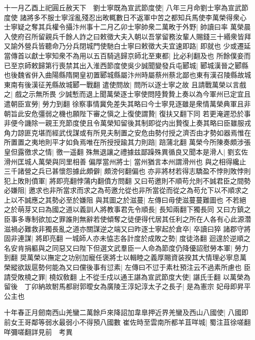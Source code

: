 十一月乙酉上祀圓丘赦天下　劉士寧既為宣武節度使|{
	八年三月命劉士寧為宣武節度使}
諸將多不服士寧淫亂殘忍出畋輒數日不返軍中苦之都知兵馬使李萬榮得衆心士寧疑之奪其兵權令攝汴州事十二月乙卯士寧帥衆二萬畋于外野|{
	帥讀曰率}
萬榮晨入使府召所留親兵千餘人詐之曰敕徵大夫入朝以吾掌留務汝輩人賜錢三十緡衆皆拜又諭外營兵皆聽命乃分兵閉城門使馳白士寧曰敕徵大夫宜速即路|{
	即就也}
少或遷延當傳首以獻士寧知衆不為用以五百騎逃歸京師北至東都|{
	比必利翻及也}
所餘僕妾而已至京師敕歸第行喪禁其出入淮西節度使吳少誠聞變發兵屯郾城|{
	郾城漢晉之郾縣也後魏省倂入曲陽縣隋開皇初置郾城縣屬汴州時屬蔡州蔡北鄙也東有漢召陵縣故城東南有後漢征羌縣故城郾一戰翻}
遣使問故|{
	問所以逐士寧之故}
且請戰萬榮以言戲之|{
	戲之示無所畏}
少誠慙而退上聞萬榮逐士寧使問陸贄贄上奏以為今軍州已定宜且遣朝臣宣勞|{
	勞力到翻}
徐察事情冀免差失其略曰今士寧見逐雖是衆情萬榮典軍且非朝旨此安危彊弱之機也願陛下審之愼之上復使謂贄|{
	復扶又翻下同}
若更淹遲恐於事非便今譏除一親王充節度使且令萬榮知留後其制即從内出贄復上奏其略曰臣雖服戎角力諒匪克堪而經武伐謀或有所見夫制置之安危由勢付授之濟否由才勢如器焉惟在所置置之夷地則平才如負焉唯在所授授踰其力則踣|{
	踣蒲北翻}
萬榮今所陳奏頗涉張皇但露徼求之情|{
	徼一遥翻}
殊無退讓之禮據兹鄙躁殊異循良又聞本是滑人|{
	劉玄佐滑州匡城人萬榮與同里相善}
偏厚當州將士|{
	當州猶言本州謂滑州也}
與之相得纔止三千諸營之兵已甚懷怨據此頗僻|{
	頗滂何翻偏也}
亦非將材若得志驕盈不悖則敗悖則犯上敗則僨軍|{
	將即亮翻悖蒲内翻僨方問翻}
又曰苟邀則不順苟允則不誠君臣之間勢必嫌阻|{
	邀求也非所當求而求之為苟邀允從也非所當從而從之為苟允下以不順求之上以不誠應之其勢必至於嫌阻}
與其圖之於滋蔓|{
	左傳曰毋使滋蔓蔓難圖也}
不若絕之於萌芽又曰為國之道以義訓人將教事君先令順長|{
	長知兩翻下獨長同}
又曰方鎮之臣事多專制欲加之罪誰則無辭若使傾奪之徒便得代居其任利之所在人各有心此源濳滋禍必難救非獨長亂之道亦關謀逆之端又曰昨逐士寧起於倉卒|{
	卒讀曰猝}
諸郡守將固非連謀|{
	將即亮翻}
一城師人亦未恊志各計度於成敗之勢|{
	度徒洛翻}
迴遑於逆順之名安肯捐軀與之同惡又曰陛下但選文武羣臣一人命為節度仍降優詔慰勞本軍|{
	勞力到翻}
奨萬榮以撫定之功别加寵任褒將士以輯睦之義厚賜資装揆其大情理必寧息萬榮縱欲跋扈勢何能為又曰儻後事有愆素|{
	左傳曰不愆于素杜預注云不過素所慮也}
臣請受敗橈之罪|{
	橈奴敎翻}
上不從壬戍以通王諶為宣武節度大使|{
	諶氏壬翻}
以萬榮為留後　丁卯納故駙馬都尉郭曖女為廣陵王淳妃淳太子之長子|{
	是為憲宗}
妃母即昇平公主也

十年春正月劒南西山羌蠻二萬餘戶來降詔加韋臯押近界羌蠻及西山八國使|{
	八國即前女王哥鄰等弱水最弱小不得預八國數}
崔佐時至雲南所都羊苴咩城|{
	蜀注苴徐嗟翻咩彌嗟翻詳見前　考異}


